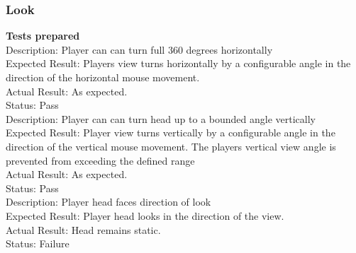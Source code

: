 \documentclass[11pt,a4paper]{article}
\begin{document}
\subsubsection{Look}
\textbf{Tests prepared}\\
Description: Player can can turn full 360 degrees horizontally\\
Expected Result: Players view turns horizontally by a configurable angle in the direction of the horizontal mouse movement.\\
Actual Result: As expected.\\
Status: Pass
\smallskip\\
Description: Player can can turn head up to a bounded angle vertically\\
Expected Result: Player view turns vertically by a configurable angle in the direction of the vertical mouse movement. The players vertical view angle is prevented from exceeding the defined range\\
Actual Result: As expected.\\
Status: Pass
\smallskip\\
Description: Player head faces direction of look\\
Expected Result: Player head looks in the direction of the view.\\
Actual Result:  Head remains static.\\
Status: Failure
\end{document}
